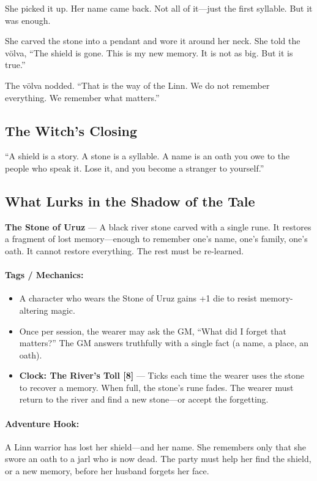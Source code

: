 \documentclass[9pt,a5paper]{extbook}
\begin{document}
She picked it up. Her name came back. Not all of it---just the first syllable. But it was enough.

She carved the stone into a pendant and wore it around her neck. She told the völva, ``The shield is gone. This is my new memory. It is not as big. But it is true.''

The völva nodded. ``That is the way of the Linn. We do not remember everything. We remember what matters.''

\subsection*{The Witch's Closing}

``A shield is a story. A stone is a syllable. A name is an oath you owe to the people who speak it. Lose it, and you become a stranger to yourself.''

\subsection*{What Lurks in the Shadow of the Tale}

\textbf{The Stone of Uruz} --- A black river stone carved with a single rune. It restores a fragment of lost memory---enough to remember one's name, one's family, one's oath. It cannot restore everything. The rest must be re-learned.

\paragraph{Tags / Mechanics:}
\begin{itemize}
    \item A character who wears the Stone of Uruz gains +1 die to resist memory-altering magic.
    \item Once per session, the wearer may ask the GM, ``What did I forget that matters?'' The GM answers truthfully with a single fact (a name, a place, an oath).
    \item \textbf{Clock: The River's Toll [8]} --- Ticks each time the wearer uses the stone to recover a memory. When full, the stone's rune fades. The wearer must return to the river and find a new stone---or accept the forgetting.
\end{itemize}

\paragraph{Adventure Hook:}
A Linn warrior has lost her shield---and her name. She remembers only that she swore an oath to a jarl who is now dead. The party must help her find the shield, or a new memory, before her husband forgets her face.
\end{document}
